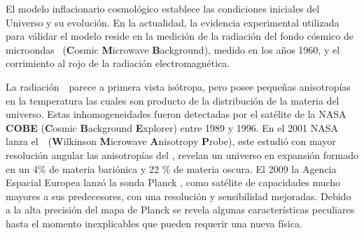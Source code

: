 
El modelo inflacionario cosmológico establece las condiciones iniciales del Universo y su evolución. En la actualidad, la evidencia experimental utilizada para válidar el modelo reside en la medición de la radiación del fondo cósmico de microondas \CMB~(\textbf{C}osmic \textbf{M}icrowave \textbf{B}ackground), medido en los años 1960, y el corrimiento al rojo de la radiación electromagnética. %

La radiación~\CMB~parece a primera vista isótropa, pero posee pequeñas anisotropías en la temperatura las cuales son producto de la distribución de la materia del universo. Estas inhomogeneidades fueron detectadas por el satélite de la NASA \textbf{COBE} (\textbf{C}osmic \textbf{B}ackground \textbf{E}xplorer) entre 1989 y 1996. 
En el 2001 NASA lanza el~\WMAP~(\textbf{W}ilkinson \textbf{M}icrowave \textbf{A}nisotropy \textbf{P}robe), %
 este estudió con mayor resolución angular las anisotropías del \CMB, revelan un universo en expansión formado en un 4\% de materia bariónica y 22 \% de materia oscura. 
El 2009 la Agencia Espacial Europea lanzó la sonda Planck \citep{planck_collaboration_planck_2019}, como satélite de capacidades mucho mayores a sus predecesores, con una resolución y sensibilidad mejoradas. Debido a la alta precisión del mapa de Planck se revela algunas características peculiares hasta el momento inexplicables que pueden requerir una nueva física.


